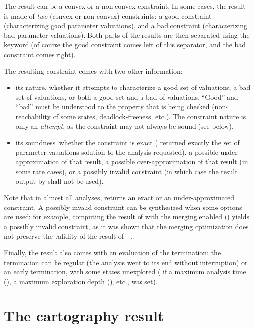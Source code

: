 The result can be a convex or a non-convex constraint.
In some cases, the result is made of \emph{two} (convex or non-convex) constraints: a good constraint (characterizing good parameter valuations), and a bad constraint (characterizing bad parameter valuations).
Both parts of the results are then separated using the keyword  (of course the good constraint comes left of this separator, and the bad constraint comes right).

The resulting constraint comes with two other information:
\begin{itemize}
	\item its nature, \ie{} whether it attempts to characterize a good set of valuations, a bad set of valuations, or both a good set and a bad of valuations.
	      ``Good'' and ``bad'' must be understood to the property that is being checked (non-reachability of some states, deadlock-freeness, etc.).
	      The constraint nature is only an \emph{attempt}, as the constraint may not always be sound (see below).
	\item its soundness, \ie{} whether the constraint is exact (\imitator{} returned exactly the set of parameter valuations solution to the analysis requested), a possible under-approximation of that result, a possible over-approximation of that result (in some rare cases), or a possibly invalid constraint (in which case the result output by \imitator{} shall not be used).
\end{itemize}
Note that in almost all analyses, \imitator{} returns an exact or an under-approximated constraint.
A possibly invalid constraint can be synthesized when some options are used: for example, computing the result of \IM{} with the merging enabled () yields a possibly invalid constraint, as it was shown that the merging optimization does not preserve the validity of the result of~\IM{}~\cite{AFS13atva}.

Finally, the result also comes with an evaluation of the termination: the termination can be regular (the analysis went to its end without interruption) or an early termination, with some states unexplored (\eg{} if a maximum analysis time (), a maximum exploration depth (), etc., was set).


\section{The cartography result}


